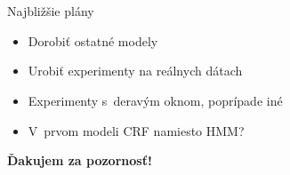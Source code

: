 \documentclass[xcolor=dvipsnames, compress, 12pt, t]{beamer}
\begin{document}
\section{}
\begin{frame}{Najbližšie plány}
  \begin{itemize}
    \item Dorobiť ostatné modely
    \item Urobiť experimenty na reálnych dátach
    \item Experimenty s~deravým oknom, poprípade iné
    \item V~prvom modeli CRF namiesto HMM?
  \end{itemize}
\end{frame}

\begin{frame}[plain, c]
  \transdissolve[duration=5]
  \begin{center}
  \textbf{\color{Green} \LARGE Ďakujem za pozornosť!}
  \end{center}
\end{frame}
\end{document}
